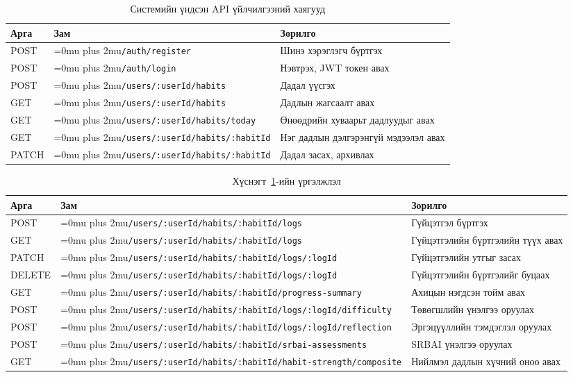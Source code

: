 {
\renewcommand{\arraystretch}{1.08}
\setlength{\tabcolsep}{3pt}
\providecommand{\apiendpoint}[1]{\begingroup\Urlmuskip=0mu plus 2mu\nolinkurl{#1}\endgroup}

\begin{table}[H]
\centering
\scriptsize
\begin{tabular}{L{1.25cm}L{7.0cm}L{4.4cm}}
\toprule
\textbf{Арга} & \textbf{Зам} & \textbf{Зорилго} \\
\midrule
POST  & \apiendpoint{/auth/register} & Шинэ хэрэглэгч бүртгэх \\
POST  & \apiendpoint{/auth/login} & Нэвтрэх, JWT токен авах \\
POST  & \apiendpoint{/users/:userId/habits} & Дадал үүсгэх \\
GET   & \apiendpoint{/users/:userId/habits} & Дадлын жагсаалт авах \\
GET   & \apiendpoint{/users/:userId/habits/today} & Өнөөдрийн хуваарьт дадлуудыг авах \\
GET   & \apiendpoint{/users/:userId/habits/:habitId} & Нэг дадлын дэлгэрэнгүй мэдээлэл авах \\
PATCH & \apiendpoint{/users/:userId/habits/:habitId} & Дадал засах, архивлах \\
\bottomrule
\end{tabular}
\caption{Системийн үндсэн API үйлчилгээний хаягууд}
\label{tab:api-overview}
\end{table}

\begin{table}[H]
\centering
\scriptsize
\caption*{Хүснэгт~\ref{tab:api-overview}-ийн үргэлжлэл}
\begin{tabular}{L{1.25cm}L{7.0cm}L{4.4cm}}
\toprule
\textbf{Арга} & \textbf{Зам} & \textbf{Зорилго} \\
\midrule
POST  & \apiendpoint{/users/:userId/habits/:habitId/logs} & Гүйцэтгэл бүртгэх \\
GET   & \apiendpoint{/users/:userId/habits/:habitId/logs} & Гүйцэтгэлийн бүртгэлийн түүх авах \\
PATCH & \apiendpoint{/users/:userId/habits/:habitId/logs/:logId} & Гүйцэтгэлийн утгыг засах \\
DELETE & \apiendpoint{/users/:userId/habits/:habitId/logs/:logId} & Гүйцэтгэлийн бүртгэлийг буцаах \\
GET   & \apiendpoint{/users/:userId/habits/:habitId/progress-summary} & Ахицын нэгдсэн тойм авах \\
POST  & \apiendpoint{/users/:userId/habits/:habitId/logs/:logId/difficulty} & Төвөгшлийн үнэлгээ оруулах \\
POST  & \apiendpoint{/users/:userId/habits/:habitId/logs/:logId/reflection} & Эргэцүүллийн тэмдэглэл оруулах \\
POST  & \apiendpoint{/users/:userId/habits/:habitId/srbai-assessments} & SRBAI үнэлгээ оруулах \\
GET   & \apiendpoint{/users/:userId/habits/:habitId/habit-strength/composite} & Нийлмэл дадлын хүчний оноо авах \\
\bottomrule
\end{tabular}
\end{table}

}
